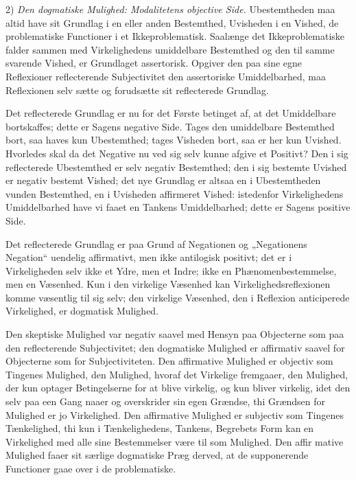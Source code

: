 \documentclass[12pt]{book}
\newcommand{\opage}[1]{\marginnote{\footnotesize\textit{[#1]}}}
\begin{document}
2) \emph{Den dogmatiske Mulighed: Modalitetens objective Side.} Ubestemtheden maa altid have sit Grundlag i en eller anden Bestemthed, Uvisheden i en Vished, de problematiske Functioner i et Ikkeproblematisk. Saalænge det Ikkeproblematiske falder sammen med Virkelighedens umiddelbare Bestemthed og den til samme svarende Vished, er Grundlaget
\opage{223}assertorisk. Opgiver den paa sine egne Reflexioner reflecterende Subjectivitet den assertoriske Umiddelbarhed, maa Reflexionen selv sætte og forudsætte sit reflecterede Grundlag.

Det reflecterede Grundlag er nu for det Første betinget af, at det Umiddelbare bortskaffes; dette er Sagens negative Side. Tages den umiddelbare Bestemthed bort, saa haves kun Ubestemthed; tages Visheden bort, saa er her kun Uvished. Hvorledes skal da det Negative nu ved sig selv kunne afgive et Positivt? Den i sig reflecterede Ubestemthed er selv negativ Bestemthed; den i sig bestemte Uvished er negativ bestemt Vished; det nye Grundlag er altsaa en i Ubestemtheden vunden Bestemthed, en i Uvisheden affirmeret Vished: istedenfor Virkelighedens Umiddelbarhed have vi faaet en Tankens Umiddelbarhed; dette er Sagens positive Side.

Det reflecterede Grundlag er paa Grund af Negationen og „Negationens Negation“ uendelig affirmativt, men ikke antilogisk positivt; det er i Virkeligheden selv ikke et Ydre, men et Indre; ikke en Phænomenbestemmelse, men en Væsenhed. Kun i den virkelige Væsenhed kan Virkelighedsreflexionen komme væsentlig til sig selv; den virkelige Væsenhed, den i Reflexion anticiperede Virkelighed, er dogmatisk Mulighed.

Den skeptiske Mulighed var negativ saavel med Hensyn paa Objecterne som paa den reflecterende Subjectivitet; den dogmatiske Mulighed er affirmativ saavel for Objecterne som for Subjectiviteten. Den affirmative Mulighed er objectiv som Tingenes Mulighed, den Mulighed, hvoraf det Virkelige fremgaaer, den Mulighed, der kun optager Betingelserne for at blive virkelig, og kun bliver virkelig, idet den selv paa een Gang naaer og overskrider sin egen Grændse, thi Grændsen for Mulighed er jo Virkelighed. Den affirmative Mulighed er subjectiv som Tingenes Tænkelighed, thi kun i Tænkelighedens, Tankens, Begrebets Form kan en Virkelighed med alle sine Bestemmelser være til som Mulighed. Den affir%
\opage{224}mative Mulighed faaer sit særlige dogmatiske Præg derved, at de supponerende Functioner gaae over i de problematiske.
\end{document}
